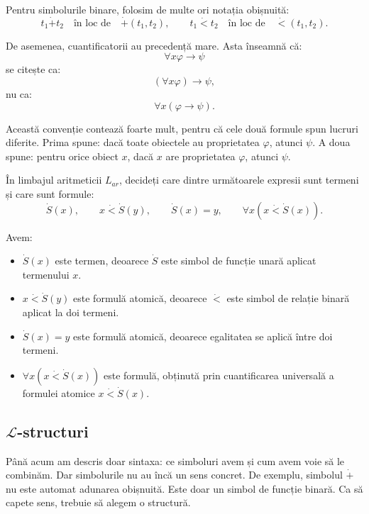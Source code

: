 Pentru simbolurile binare, folosim de multe ori notația obișnuită:
\[
	t_1 \dot{+} t_2 \quad \text{în loc de} \quad \dot{+}(t_1,t_2),
	\qquad
	t_1 \dot{<} t_2 \quad \text{în loc de} \quad \dot{<}(t_1,t_2).
\]

De asemenea, cuantificatorii au precedență mare. Asta înseamnă că:
\[
	\forall x \varphi \to \psi
\]
se citește ca:
\[
	(\forall x \varphi) \to \psi,
\]
nu ca:
\[
	\forall x(\varphi \to \psi).
\]

Această convenție contează foarte mult, pentru că cele două formule spun lucruri diferite. Prima spune: dacă toate obiectele au proprietatea \(\varphi\), atunci \(\psi\).
A doua spune: pentru orice obiect \(x\), dacă \(x\) are proprietatea \(\varphi\), atunci \(\psi\).

\begin{ex}
	În limbajul aritmeticii \(L_{ar}\), decideți care dintre următoarele expresii sunt termeni și care sunt formule:
	\[
		\dot{S}(x), \qquad x \dot{<} \dot{S}(y), \qquad \dot{S}(x) = y, \qquad \forall x(x \dot{<} \dot{S}(x)).
	\]
\end{ex}

\begin{solutie}
	Avem:

	\begin{itemize}
		\item \(\dot{S}(x)\) este termen, deoarece \(\dot{S}\) este simbol de funcție unară aplicat termenului \(x\).
		\item \(x \dot{<} \dot{S}(y)\) este formulă atomică, deoarece \(\dot{<}\) este simbol de relație binară aplicat la doi termeni.
		\item \(\dot{S}(x) = y\) este formulă atomică, deoarece egalitatea se aplică între doi termeni.
		\item \(\forall x(x \dot{<} \dot{S}(x))\) este formulă, obținută prin cuantificarea universală a formulei atomice \(x \dot{<} \dot{S}(x)\).
	\end{itemize}
\end{solutie}

\subsection{\( \mathcal{L} \)-structuri}

Până acum am descris doar sintaxa: ce simboluri avem și cum avem voie să le combinăm. Dar simbolurile nu au încă un sens concret.
De exemplu, simbolul \(\dot{+}\) nu este automat adunarea obișnuită. Este doar un simbol de funcție binară. Ca să capete sens, trebuie să alegem o structură.


